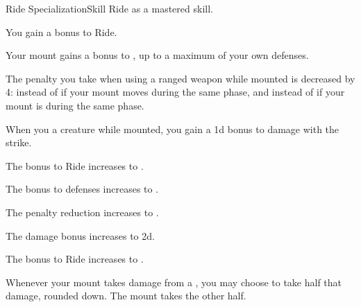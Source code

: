     \begin{feat}{Ride Specialization}{Skill}
        \featpre Ride as a mastered skill.

         You gain a  bonus to Ride.

         Your mount gains a  bonus to , up to a maximum of your own defenses.

         The penalty you take when using a ranged weapon while mounted is decreased by 4:  instead of  if your mount moves during the same phase, and  instead of  if your mount is  during the same phase.

         When you  a creature while mounted, you gain a \plus1d bonus to damage with the strike.

         The bonus to Ride increases to .

         The bonus to defenses increases to .

         The penalty reduction increases to .

         The damage bonus increases to \plus2d.

         The bonus to Ride increases to .

         Whenever your mount takes damage from a , you may choose to take half that damage, rounded down.
        The mount takes the other half.
    \end{feat}

